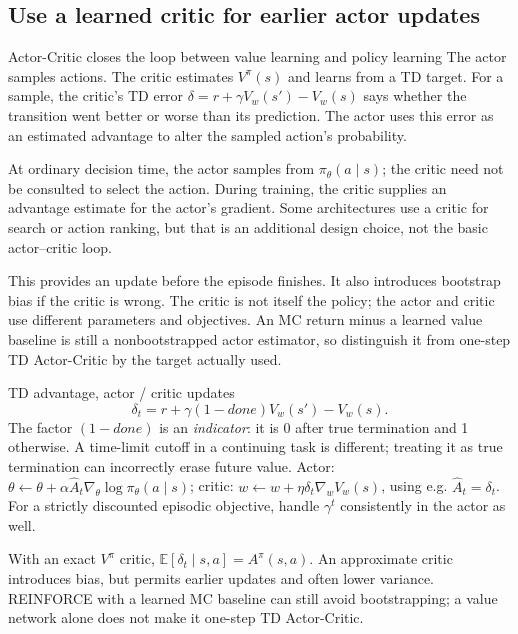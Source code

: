 \documentclass[10pt,a4paper]{article}
\newcommand{\E}{\mathbb E}
\begin{document}
\subsection{Use a learned critic for earlier actor updates}
\begin{card}{Actor-Critic closes the loop between value learning and policy learning}
The actor samples actions. The critic estimates $V^\pi(s)$ and learns from a TD target. For a sample, the critic's TD error $\delta=r+\gamma V_w(s')-V_w(s)$ says whether the transition went better or worse than its prediction. The actor uses this error as an estimated advantage to alter the sampled action's probability.

At ordinary decision time, the actor samples from $\pi_\theta(a\mid s)$; the critic need not be consulted to select the action. During training, the critic supplies an advantage estimate for the actor's gradient. Some architectures use a critic for search or action ranking, but that is an additional design choice, not the basic actor--critic loop.

This provides an update before the episode finishes. It also introduces bootstrap bias if the critic is wrong. The critic is not itself the policy; the actor and critic use different parameters and objectives. An MC return minus a learned value baseline is still a nonbootstrapped actor estimator, so distinguish it from one-step TD Actor-Critic by the target actually used.
\end{card}
\begin{card}{TD advantage, actor / critic updates}
\[
\delta_t=r+\gamma(1-done)V_w(s')-V_w(s).
\]
The factor $(1-done)$ is an \emph{indicator}: it is 0 after true termination and 1 otherwise. A time-limit cutoff in a continuing task is different; treating it as true termination can incorrectly erase future value.
Actor: $\theta\leftarrow\theta+\alpha\widehat A_t\nabla_\theta\log\pi_\theta(a\mid s)$; critic: $w\leftarrow w+\eta\delta_t\nabla_wV_w(s)$, using e.g. $\widehat A_t=\delta_t$. For a strictly discounted episodic objective, handle $\gamma^t$ consistently in the actor as well.

With an exact $V^\pi$ critic, $\E[\delta_t\mid s,a]=A^\pi(s,a)$. An approximate critic introduces bias, but permits earlier updates and often lower variance.
REINFORCE with a learned MC baseline can still avoid bootstrapping; a value network alone does not make it one-step TD Actor-Critic.
\end{card}
\end{document}
